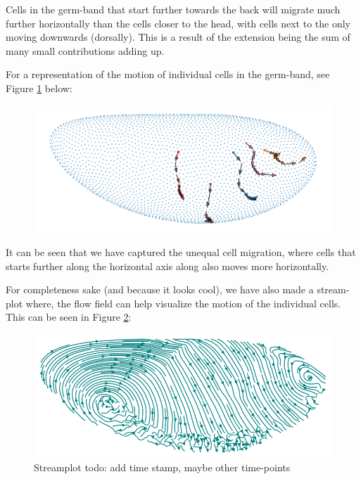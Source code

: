 Cells in the germ-band that start further towards the back will migrate much further horizontally than the cells closer to the head, with cells next to the  only moving downwards (dorsally). This is a result of the extension being the sum of many small contributions  adding up.

For a representation of the motion of individual cells in the germ-band, see Figure \ref{fig:GBMovements} below:
\begin{figure}[H]
    \centering
    \includegraphics[width=1\linewidth]{chapters/Results/figures/movements.png}
    \caption{}
    \label{fig:GBMovements}
\end{figure}

It can be seen that we have captured the unequal cell migration, where cells that starts further along the horizontal axis along also moves more horizontally.

For completeness sake (and because it looks cool), we have also made a stream-plot where, the flow field can help visualize the motion of the individual cells. This can be seen in Figure \ref{fig:streamplot}:


\begin{figure}[H]
    \centering
    \includegraphics[width=1\linewidth]{chapters/Results/figures/streamplot2.png}
    \caption{Streamplot todo: add time stamp, maybe other time-points }
    \label{fig:streamplot}
\end{figure}


